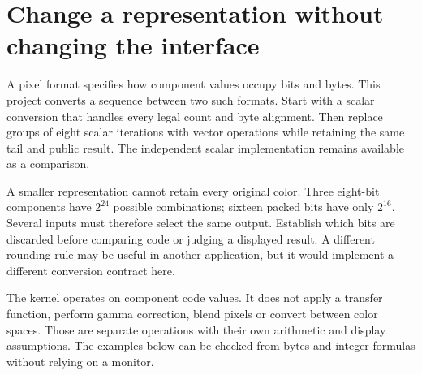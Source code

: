 \section{Change a representation without changing the interface}\label{rgb-purpose}
A pixel format specifies how component values occupy bits and bytes. This project
converts a sequence between two such formats. Start with a scalar conversion that
handles every legal count and byte alignment. Then replace groups of eight scalar
iterations with vector operations while retaining the same tail and public result.
The independent scalar implementation remains available as a comparison.

A smaller representation cannot retain every original color. Three eight-bit
components have $2^{24}$ possible combinations; sixteen packed bits have only
$2^{16}$. Several inputs must therefore select the same output. Establish which
bits are discarded before comparing code or judging a displayed result. A different
rounding rule may be useful in another application, but it would implement a
different conversion contract here.

The kernel operates on component code values. It does not apply a transfer function,
perform gamma correction, blend pixels or convert between color spaces. Those are
separate operations with their own arithmetic and display assumptions. The examples
below can be checked from bytes and integer formulas without relying on a monitor.
